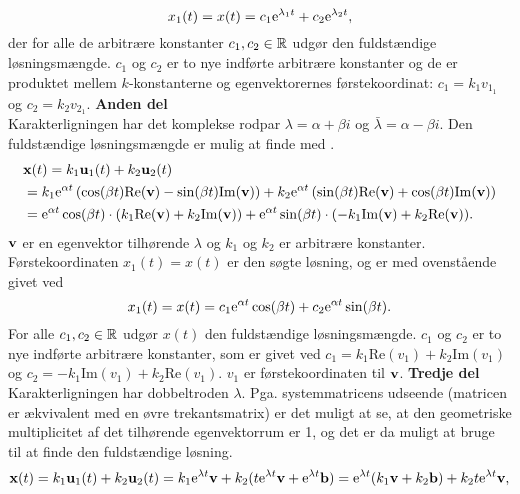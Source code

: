 \begin{bevis}
\begin{equation}
x_1(t) = x(t) = c_1 \mathrm{e}^{\lambda_1 t} + c_2 \mathrm{e}^{\lambda_2 t},
\end{equation}
der for alle de arbitrære konstanter $ c_1,c_2 \in \mathbb{R} $ udgør den fuldstændige løsningsmængde. $ c_1 $ og $ c_2 $ er to nye indførte arbitrære konstanter og de er produktet mellem $ k $-konstanterne og egenvektorernes førstekoordinat: $ c_1 = k_1 v_{1_1} $ og $ c_2 = k_2 v_{2_1} $.\bs
\textbf{Anden del} \\
Karakterligningen har det komplekse rodpar $ \lambda = \alpha + \beta i $ og $ \bar{\lambda} = \alpha - \beta i $. Den fuldstændige løsningsmængde er mulig at finde med .
\begin{equation}
\begin{aligned}
&\mathbf{x}(t) = k_1 \mathbf{u}_1(t) + k_2 \mathbf{u}_2(t) \\
&= k_1 \mathrm{e}^{\alpha t} \left(\cos(\beta t) \mathrm{Re}(\mathbf{v}) - \sin(\beta t) \mathrm{Im}(\mathbf{v}) \right) + k_2 \mathrm{e}^{\alpha t} \left(\sin(\beta t) \mathrm{Re}(\mathbf{v}) + \cos(\beta t) \mathrm{Im}(\mathbf{v}) \right) \\
&= \mathrm{e}^{\alpha t} \cos(\beta t) \cdot (k_1 \mathrm{Re}(\mathbf{v}) + k_2 \mathrm{Im}(\mathbf{v})) + \mathrm{e}^{\alpha t} \sin(\beta t) \cdot (-k_1 \mathrm{Im}(\mathbf{v}) + k_2 \mathrm{Re}(\mathbf{v})).
\end{aligned}
\end{equation}
$ \mathbf{v} $ er en egenvektor tilhørende $ \lambda $ og $ k_1 $ og $ k_2 $ er arbitrære konstanter. Førstekoordinaten $ x_1(t) = x(t) $ er den søgte løsning, og er med ovenstående givet ved
\begin{equation}
x_1(t) = x(t) = c_1\mathrm{e}^{\alpha t}\cos(\beta t) + c_2\mathrm{e}^{\alpha t}\sin(\beta t).
\end{equation}
For alle $ c_1,c_2 \in \mathbb{R} $ udgør $ x(t) $ den fuldstændige løsningsmængde. $ c_1 $ og $ c_2 $ er to nye indførte arbitrære konstanter, som er givet ved $ c_1 = k_1 \mathrm{Re}(v_1) + k_2 \mathrm{Im}(v_1) $ og $ c_2 = -k_1 \mathrm{Im}(v_1) + k_2 \mathrm{Re}(v_1) $. $ v_1 $ er førstekoordinaten til $ \mathbf{v} $.\bs
\textbf{Tredje del} \\
Karakterligningen har dobbeltroden $ \lambda $. Pga. systemmatricens udseende (matricen er ækvivalent med en øvre trekantsmatrix) er det muligt at se, at den geometriske multiplicitet af det tilhørende egenvektorrum er 1, og det er da muligt at bruge  til at finde den fuldstændige løsning.
\begin{equation}
\mx(t) = k_1 \mathbf{u}_1(t) + k_2 \mathbf{u}_2(t) = k_1 \e^{\lambda t} \mv + k_2 (t \e^{\lambda t} \mv + \e^{\lambda t} \mb) = \e^{\lambda t} (k_1 \mv + k_2 \mb) + k_2 t \e^{\lambda t} \mv,

\end{equation}
\end{bevis}
